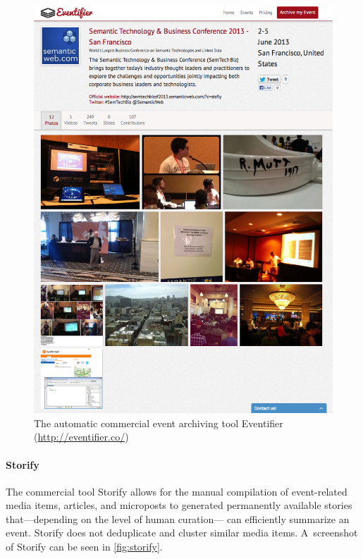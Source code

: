 \begin{figure}
  \centering
  \includegraphics[width=\linewidth]{eventifier.png}
  \caption{The automatic commercial event archiving tool Eventifier
    (\url{http://eventifier.co/})}
  \label{fig:eventifier}
\end{figure}

\paragraph{Storify}

The commercial tool Storify allows for the manual compilation of
event-related media items, articles, and microposts
to generated permanently available stories
that---depending on the level of human curation---%
can efficiently summarize an event.
Storify does not deduplicate and cluster
similar media items.
A~screenshot of Storify can be seen in \autoref{fig:storify}.

